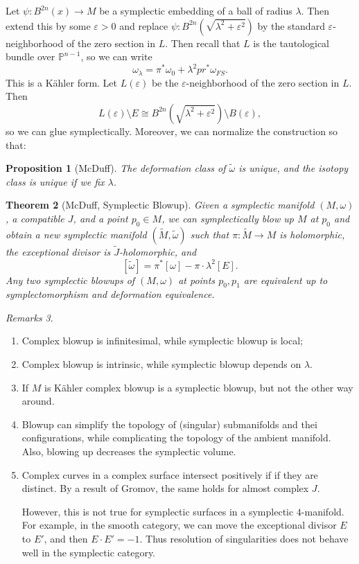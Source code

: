 \documentclass[leqno, openany]{memoir}
\newtheorem{thm}{Theorem}[chapter]
\newtheorem{prop}[thm]{Proposition}
\theoremstyle{definition}
\theoremstyle{remark}
\newtheorem{rmks}[thm]{Remarks}
\theoremstyle{plain}
\theoremstyle{definition}
\theoremstyle{remark}
\renewcommand{\P}{\mathbb{P}}
\newcommand{\ep}{\varepsilon}
\newcommand{\wt}[1]{\widetilde{#1}}
\begin{document}
    Let $\psi: B^{2n}(x) \to M$ be a symplectic embedding of a ball of radius $\lambda$. Then extend this by some $\ep >0$ and replace $\psi: B^{2n}(\sqrt{\lambda^2 + \ep^2})$ by the standard $\ep$-neighborhood of the zero section in $L$. Then recall that $L$ is the tautological bundle over $\P^{n-1}$, so we can write
    \[ \omega_{\lambda} = \pi^* \omega_0 + \lambda^2 pr^* \omega_{FS}. \]
    This is a K\"ahler form. Let $L(\ep)$ be the $\ep$-neighborhood of the zero section in $L$. Then
    \[ L(\ep) \setminus E \cong B^{2n}(\sqrt{\lambda^2 + \ep^2}) \setminus B(\ep), \]
    so we can glue symplectically. Moreover, we can normalize the construction so that:
    \begin{prop}[McDuff]
        The deformation class of $\wt{\omega}$ is unique, and the isotopy class is unique if we fix $\lambda$.
    \end{prop}
    
    \begin{thm}[McDuff, Symplectic Blowup]
        Given a symplectic manifold $(M, \omega)$, a compatible $J$, and a point $p_0 \in M$, we can symplectically blow up $M$ at $p_0$ and obtain a new symplectic manifold $(\wt{M}, \wt{\omega})$ such that $\pi: \wt{M} \to M$ is holomorphic, the exceptional divisor is $\wt{J}$-holomorphic, and 
        \[ [\wt{\omega}] = \pi^* [\omega] - \pi \cdot \lambda^2 [E]. \]
        Any two symplectic blowups of $(M, \omega)$ at points $p_0, p_1$ are equivalent up to symplectomorphism and deformation equivalence.
    \end{thm}

    \begin{rmks}
        \begin{enumerate}
            \item Complex blowup is infinitesimal, while symplectic blowup is local;
            \item Complex blowup is intrinsic, while symplectic blowup depends on $\lambda$.
            \item If $M$ is K\"ahler complex blowup is a symplectic blowup, but not the other way around.
            \item Blowup can simplify the topology of (singular) submanifolds and thei configurations, while complicating the topology of the ambient manifold. Also, blowing up decreases the symplectic volume.
            \item Complex curves in a complex surface intersect positively if if they are distinct. By a result of Gromov, the same holds for almost complex $J$.

                However, this is not true for symplectic surfaces in a symplectic $4$-manifold. For example, in the smooth category, we can move the exceptional divisor $E$ to $E'$, and then $E \cdot E' = -1$. Thus resolution of singularities does not behave well in the symplectic category.
        \end{enumerate}
    \end{rmks}
\end{document}
